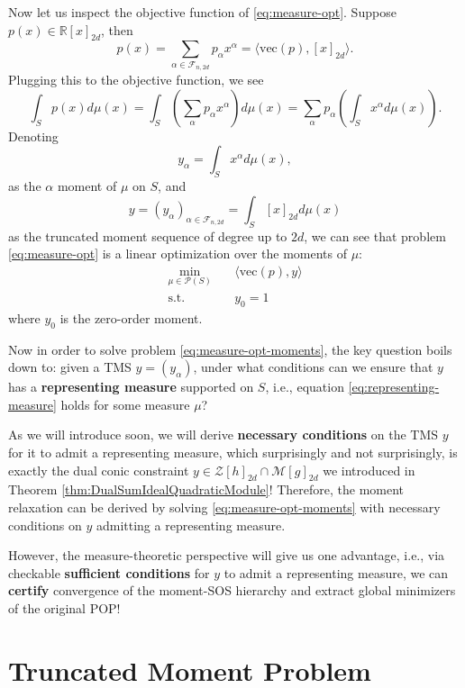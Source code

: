 \documentclass[
]{book}
\theoremstyle{definition}
\theoremstyle{definition}
\theoremstyle{definition}
\theoremstyle{definition}
\theoremstyle{remark}
\begin{document}
Now let us inspect the objective function of \eqref{eq:measure-opt}. Suppose \(p(x) \in \mathbb{R}[x]_{2d}\), then
\[
p(x) = \sum_{\alpha \in \mathcal{F}_{n,2d}} p_{\alpha} x^{\alpha} = \langle \mathrm{vec}(p), [x]_{2d} \rangle.
\]
Plugging this to the objective function, we see
\[
\int_S p(x) d \mu(x) = \int_S \left(\sum_{\alpha} p_{\alpha} x^{\alpha}\right) d \mu(x) = \sum_{\alpha} p_{\alpha} \left(\int_S x^{\alpha} d \mu(x)\right).
\]
Denoting
\[
y_{\alpha} = \int_S x^{\alpha} d \mu(x), 
\]
as the \(\alpha\) moment of \(\mu\) on \(S\), and
\begin{equation}
y = (y_\alpha)_{\alpha \in \mathcal{F}_{n,2d}} = \int_S [x]_{2d} d \mu(x)
\label{eq:representing-measure}
\end{equation}
as the truncated moment sequence of degree up to \(2d\), we can see that problem \eqref{eq:measure-opt} is a linear optimization over the moments of \(\mu\):
\begin{equation}
\begin{split}
\min_{\mu \in \mathcal{P}(S)} & \quad \langle \mathrm{vec}(p), y \rangle \\
\mathrm{s.t.}& \quad y_0 = 1
\end{split}
\label{eq:measure-opt-moments}
\end{equation}
where \(y_0\) is the zero-order moment.

Now in order to solve problem \eqref{eq:measure-opt-moments}, the key question boils down to: given a TMS \(y = (y_{\alpha})\), under what conditions can we ensure that \(y\) has a \textbf{representing measure} supported on \(S\), i.e., equation \eqref{eq:representing-measure} holds for some measure \(\mu\)?

As we will introduce soon, we will derive \textbf{necessary conditions} on the TMS \(y\) for it to admit a representing measure, which surprisingly and not surprisingly, is exactly the dual conic constraint \(y \in \mathcal{Z}[h]_{2d} \cap \mathcal{M}[g]_{2d}\) we introduced in Theorem \ref{thm:DualSumIdealQuadraticModule}! Therefore, the moment relaxation can be derived by solving \eqref{eq:measure-opt-moments} with necessary conditions on \(y\) admitting a representing measure.

However, the measure-theoretic perspective will give us one advantage, i.e., via checkable \textbf{sufficient conditions} for \(y\) to admit a representing measure, we can \textbf{certify} convergence of the moment-SOS hierarchy and extract global minimizers of the original POP!

\section{Truncated Moment Problem}\label{truncated-moment-problem}
\end{document}
